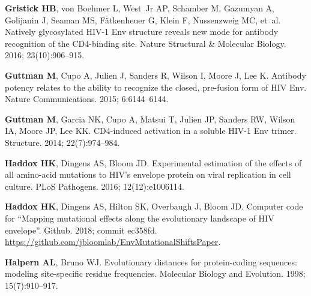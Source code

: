 \documentclass[9pt]{elife}
\begin{document}
\begin{thebibliography}{114}
\textbf{\color{eLifeMediumGrey} Gristick HB}, von Boehmer L, West~Jr AP,
  Schamber M, Gazumyan A, Golijanin J, Seaman MS, F{\"a}tkenheuer G, Klein F,
  Nussenzweig MC, et~al.
\newblock Natively glycosylated HIV-1 Env structure reveals new mode for
  antibody recognition of the CD4-binding site.
\newblock Nature Structural \& Molecular Biology.  2016; 23(10):906--915.

\textbf{\color{eLifeMediumGrey} Guttman M}, Cupo A, Julien J, Sanders R, Wilson
  I, Moore J, Lee K.
\newblock Antibody potency relates to the ability to recognize the closed,
  pre-fusion form of {HIV Env}.
\newblock Nature Communications.  2015; 6:6144--6144.

\textbf{\color{eLifeMediumGrey} Guttman M}, Garcia NK, Cupo A, Matsui T, Julien
  JP, Sanders RW, Wilson IA, Moore JP, Lee KK.
\newblock CD4-induced activation in a soluble HIV-1 Env trimer.
\newblock Structure.  2014; 22(7):974--984.

\textbf{\color{eLifeMediumGrey} Haddox HK}, Dingens AS, Bloom JD.
\newblock Experimental estimation of the effects of all amino-acid mutations to
  {HIV's} envelope protein on viral replication in cell culture.
\newblock PLoS Pathogens.  2016; 12(12):e1006114.

\textbf{\color{eLifeMediumGrey} Haddox HK}, Dingens AS, Hilton SK, Overbaugh J,
  Bloom JD.
\newblock Computer code for ``Mapping mutational effects along the evolutionary
  landscape of HIV envelope''.
\newblock Github.  2018; commit ec358fd.
\newblock
  \urlprefix\url{https://github.com/jbloomlab/EnvMutationalShiftsPaper}.

\textbf{\color{eLifeMediumGrey} Halpern AL}, Bruno WJ.
\newblock Evolutionary distances for protein-coding sequences: modeling
  site-specific residue frequencies.
\newblock Molecular Biology and Evolution.  1998; 15(7):910--917.


\end{thebibliography}
\end{document}
